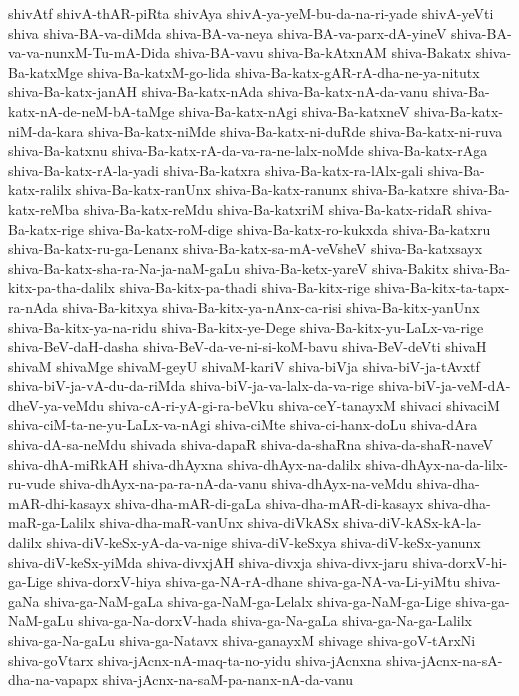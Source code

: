 {shivAtf
shivA-thAR-piRta
shivAya
shivA-ya-yeM-bu-da-na-ri-yade
shivA-yeVti
shiva
shiva-BA-va-diMda
shiva-BA-va-neya
shiva-BA-va-parx-dA-yineV
shiva-BA-va-va-nunxM-Tu-mA-Dida
shiva-BA-vavu
shiva-Ba-kAtxnAM
shiva-Bakatx
shiva-Ba-katxMge
shiva-Ba-katxM-go-lida
shiva-Ba-katx-gAR-rA-dha-ne-ya-nitutx
shiva-Ba-katx-janAH
shiva-Ba-katx-nAda
shiva-Ba-katx-nA-da-vanu
shiva-Ba-katx-nA-de-neM-bA-taMge
shiva-Ba-katx-nAgi
shiva-Ba-katxneV
shiva-Ba-katx-niM-da-kara
shiva-Ba-katx-niMde
shiva-Ba-katx-ni-duRde
shiva-Ba-katx-ni-ruva
shiva-Ba-katxnu
shiva-Ba-katx-rA-da-va-ra-ne-lalx-noMde
shiva-Ba-katx-rAga
shiva-Ba-katx-rA-la-yadi
shiva-Ba-katxra
shiva-Ba-katx-ra-lAlx-gali
shiva-Ba-katx-ralilx
shiva-Ba-katx-ranUnx
shiva-Ba-katx-ranunx
shiva-Ba-katxre
shiva-Ba-katx-reMba
shiva-Ba-katx-reMdu
shiva-Ba-katxriM
shiva-Ba-katx-ridaR
shiva-Ba-katx-rige
shiva-Ba-katx-roM-dige
shiva-Ba-katx-ro-kukxda
shiva-Ba-katxru
shiva-Ba-katx-ru-ga-Lenanx
shiva-Ba-katx-sa-mA-veVsheV
shiva-Ba-katxsayx
shiva-Ba-katx-sha-ra-Na-ja-naM-gaLu
shiva-Ba-ketx-yareV
shiva-Bakitx
shiva-Ba-kitx-pa-tha-dalilx
shiva-Ba-kitx-pa-thadi
shiva-Ba-kitx-rige
shiva-Ba-kitx-ta-tapx-ra-nAda
shiva-Ba-kitxya
shiva-Ba-kitx-ya-nAnx-ca-risi
shiva-Ba-kitx-yanUnx
shiva-Ba-kitx-ya-na-ridu
shiva-Ba-kitx-ye-Dege
shiva-Ba-kitx-yu-LaLx-va-rige
shiva-BeV-daH-dasha
shiva-BeV-da-ve-ni-si-koM-bavu
shiva-BeV-deVti
shivaH
shivaM
shivaMge
shivaM-geyU
shivaM-kariV
shiva-biVja
shiva-biV-ja-tAvxtf
shiva-biV-ja-vA-du-da-riMda
shiva-biV-ja-va-lalx-da-va-rige
shiva-biV-ja-veM-dA-dheV-ya-veMdu
shiva-cA-ri-yA-gi-ra-beVku
shiva-ceY-tanayxM
shivaci
shivaciM
shiva-ciM-ta-ne-yu-LaLx-va-nAgi
shiva-ciMte
shiva-ci-hanx-doLu
shiva-dAra
shiva-dA-sa-neMdu
shivada
shiva-dapaR
shiva-da-shaRna
shiva-da-shaR-naveV
shiva-dhA-miRkAH
shiva-dhAyxna
shiva-dhAyx-na-dalilx
shiva-dhAyx-na-da-lilx-ru-vude
shiva-dhAyx-na-pa-ra-nA-da-vanu
shiva-dhAyx-na-veMdu
shiva-dha-mAR-dhi-kasayx
shiva-dha-mAR-di-gaLa
shiva-dha-mAR-di-kasayx
shiva-dha-maR-ga-Lalilx
shiva-dha-maR-vanUnx
shiva-diVkASx
shiva-diV-kASx-kA-la-dalilx
shiva-diV-keSx-yA-da-va-nige
shiva-diV-keSxya
shiva-diV-keSx-yanunx
shiva-diV-keSx-yiMda
shiva-divxjAH
shiva-divxja
shiva-divx-jaru
shiva-dorxV-hi-ga-Lige
shiva-dorxV-hiya
shiva-ga-NA-rA-dhane
shiva-ga-NA-va-Li-yiMtu
shiva-gaNa
shiva-ga-NaM-gaLa
shiva-ga-NaM-ga-Lelalx
shiva-ga-NaM-ga-Lige
shiva-ga-NaM-gaLu
shiva-ga-Na-dorxV-hada
shiva-ga-Na-gaLa
shiva-ga-Na-ga-Lalilx
shiva-ga-Na-gaLu
shiva-ga-Natavx
shiva-ganayxM
shivage
shiva-goV-tArxNi
shiva-goVtarx
shiva-jAcnx-nA-maq-ta-no-yidu
shiva-jAcnxna
shiva-jAcnx-na-sA-dha-na-vapapx
shiva-jAcnx-na-saM-pa-nanx-nA-da-vanu
}
